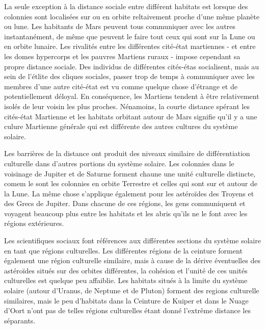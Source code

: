       La seule exception à la distance sociale entre différent habitats est lorsque des colonnies sont localisées sur ou en orbite reltaivement proche d'une même planète ou lune. Les habitants de Mars peuvent tous communiquer avec les autres instantanément, de même que peuvent le faire tout ceux qui sont sur la Lune ou en orbite lunaire. Les rivalités entre les différentes cité-état martiennes - et entre les domes hypercorps et les pauvres Martiens ruraux - impose cependant sa propre distance sociale. Des individus de différentes cités-étas socialisent, mais au sein de l'étlite des cliques sociales, passer trop de temps à communiquer avec les membres d'une autre cité-état est vu comme quelque chose d'étrange et de potentiellement déloyal. En conséquence, les Martiens tendent à être relativement isolés de leur voisin les plus proches. Nénamoins, la courte distance spérant les cités-état Martienne et les habitats orbitant autour de Mars signifie qu'il y a une culure Martienne générale qui est différente des autres cultures du système solaire. 

      Les barrières de la distance ont produit des niveaux similaire de différentiation culturelle dans d'autres portions du système solaire. Les colonnies dans le voisinage de Jupiter et de Saturne forment chaune une unité culturelle distincte, comem le sont les colonnies en orbite Terrestre et celles qui sont sur et autour de la Lune. La même chose s'applique également pour les astéroïdes des Troyens et des Grecs de Jupiter. Dans chacune de ces régions, les gens communiquent et voyagent beaucoup plus entre les habitats et les abris qu'ils ne le font avec les régions extérieures. 

      Les scientifiques sociaux font références aux différentes sections du système solaire en tant que régions culturelles. Les différentes régions de la ceinture forment également une région culturelle similaire, mais à cause de la dérive éventuelles des astéroïdes situés sur des orbites différentes, la cohésion et l'unité de ces unités culturelles est quelque peu affaiblie. Les habitats situés à la limite du système solaire (autour d'Uranus, de Neptune et de Pluton) forment des regions culturelle similaires, mais le peu d'habitats dans la Ceinture de Kuiper et dans le Nuage d'Oort n'ont pas de telles régions culturelles étant donné l'extrême distance les séparants. 

